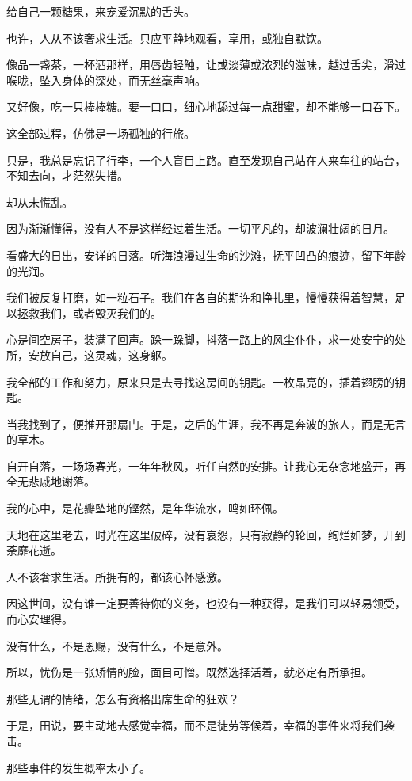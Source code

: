 \documentclass[12pt,a4paper]{article}
\def\blankrev{\vspace{1ex}}									%
\begin{document}
	\endwriting



		给自己一颗糖果，来宠爱沉默的舌头。

		\blankrev
		也许，人从不该奢求生活。只应平静地观看，享用，或独自默饮。\par
		像品一盏茶，一杯酒那样，用唇齿轻触，让或淡薄或浓烈的滋味，越过舌尖，滑过喉咙，坠入身体的深处，而无丝毫声响。\par
		又好像，吃一只棒棒糖。要一口口，细心地舔过每一点甜蜜，却不能够一口吞下。\par
		这全部过程，仿佛是一场孤独的行旅。\par
		只是，我总是忘记了行李，一个人盲目上路。直至发现自己站在人来车往的站台，不知去向，才茫然失措。

		\blankrev
		却从未慌乱。\par
		因为渐渐懂得，没有人不是这样经过着生活。一切平凡的，却波澜壮阔的日月。\par
		看盛大的日出，安详的日落。听海浪漫过生命的沙滩，抚平凹凸的痕迹，留下年龄的光润。\par
		我们被反复打磨，如一粒石子。我们在各自的期许和挣扎里，慢慢获得着智慧，足以拯救我们，或者毁灭我们的。

		\blankrev
		心是间空房子，装满了回声。跺一跺脚，抖落一路上的风尘仆仆，求一处安宁的处所，安放自己，这灵魂，这身躯。\par
		我全部的工作和努力，原来只是去寻找这房间的钥匙。一枚晶亮的，插着翅膀的钥匙。\par
		当我找到了，便推开那扇门。于是，之后的生涯，我不再是奔波的旅人，而是无言的草木。\par
		自开自落，一场场春光，一年年秋风，听任自然的安排。让我心无杂念地盛开，再全无悲戚地谢落。\par
		我的心中，是花瓣坠地的铿然，是年华流水，鸣如环佩。\par
		天地在这里老去，时光在这里破碎，没有哀怨，只有寂静的轮回，绚烂如梦，开到荼靡花逝。

		\blankrev
		人不该奢求生活。所拥有的，都该心怀感激。\par
		因这世间，没有谁一定要善待你的义务，也没有一种获得，是我们可以轻易领受，而心安理得。\par
		没有什么，不是恩赐，没有什么，不是意外。\par
		所以，忧伤是一张矫情的脸，面目可憎。既然选择活着，就必定有所承担。\par
		那些无谓的情绪，怎么有资格出席生命的狂欢？

		\blankrev
		于是，田说，要主动地去感觉幸福，而不是徒劳等候着，幸福的事件来将我们袭击。\par
		那些事件的发生概率太小了。
\end{document}
